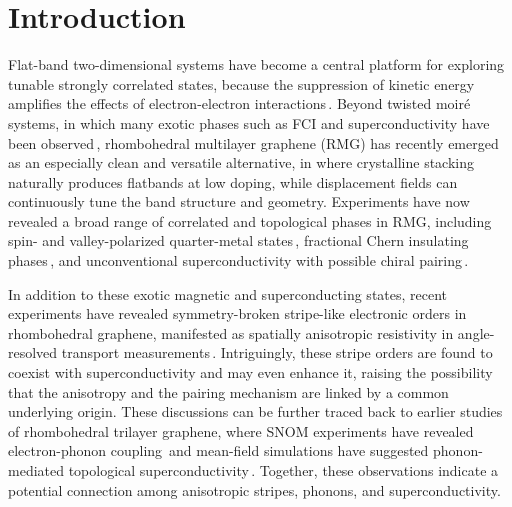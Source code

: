 \documentclass[aps,prx,article,twocolumn,amsmath,amssymb,superscriptaddress,longbibliography]{revtex4-2}
\begin{document}
\section{Introduction}

Flat-band two-dimensional systems have become a central platform for exploring tunable strongly correlated states, because the suppression of kinetic energy amplifies the effects of electron-electron interactions\,\cite{bistritzer2011moire, nuckolls2024microscopic, andrei2021marvels}. Beyond twisted moiré systems, in which many exotic phases such as FCI and superconductivity have been observed\,\cite{cao2018unconventional,cao2018correlated,balents2020superconductivity,ju2024fractional,bernevig2025fractional}, rhombohedral multilayer graphene (RMG) has recently emerged as an especially clean and versatile alternative, in where crystalline stacking naturally produces flatbands at low doping, while displacement fields can continuously tune the band structure and geometry. Experiments have now revealed a broad range of correlated and topological phases in RMG, including spin- and valley-polarized quarter-metal states\,\cite{zhou2021half, han2023orbital, auerbach2025isospin, shi2020electronic, xie2026magnetic, aronson2025displacement}, fractional Chern insulating phases\,\cite{lu2024fractional, lu2025extended, xie2025tunable, zhang2025moire, xiao2025thickness}, and unconventional superconductivity with possible chiral pairing\,\cite{zhou2021superconductivity, han2025signatures, han2026evidence, choi2025superconductivity, holleis2025fluctuating}.

In addition to these exotic magnetic and superconducting states, recent experiments have revealed symmetry-broken stripe-like electronic orders in rhombohedral graphene, manifested as spatially anisotropic resistivity in angle-resolved transport measurements\,\cite{qin2025extreme,morissette2025superconductivity}. Intriguingly, these stripe orders are found to coexist with superconductivity and may even enhance it, raising the possibility that the anisotropy and the pairing mechanism are linked by a common underlying origin. These discussions can be further traced back to earlier studies of rhombohedral trilayer graphene, where SNOM experiments have revealed electron-phonon coupling\,\cite{zan2024electron} and mean-field simulations have suggested phonon-mediated topological superconductivity\,\cite{chou2021acoustic}. Together, these observations indicate a potential connection among anisotropic stripes, phonons, and superconductivity.
\end{document}
